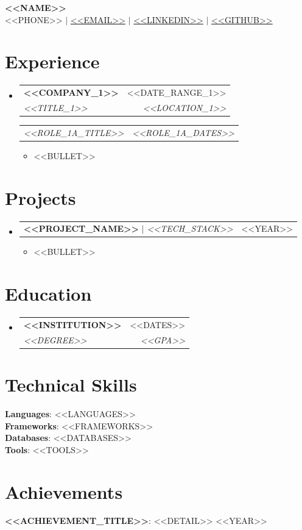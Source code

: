 \documentclass[letterpaper,11pt]{article}
\makeatletter
\newcommand{\resumeItem}[1]{
  \item\small{#1\vspace{-2pt}}
}
\newcommand{\resumeSubheading}[4]{
  \vspace{-2pt}\item
    \begin{tabular*}{0.97\textwidth}[t]{l@{\extracolsep{\fill}}r}
      \textbf{#1} & #2 \\
      \textit{\small#3} & \textit{\small #4} \\
    \end{tabular*}\vspace{-7pt}
}
\newcommand{\resumeRole}[2]{
  \vspace{2pt}
  \begin{tabular*}{0.97\textwidth}[t]{l@{\extracolsep{\fill}}r}
    \textit{\small#1} & \textit{\small #2} \\
  \end{tabular*}\vspace{-7pt}
}
\newcommand{\resumeProjectHeading}[2]{
  \vspace{-2pt}\item
    \begin{tabular*}{0.97\textwidth}[t]{l@{\extracolsep{\fill}}r}
      \small#1 & #2 \\
    \end{tabular*}\vspace{-7pt}
}
\newcommand{\resumeSubHeadingListStart}{\begin{itemize}[leftmargin=0.15in, label={}]}
\newcommand{\resumeSubHeadingListEnd}{\end{itemize}}
\newcommand{\resumeItemListStart}{\begin{itemize}}
\newcommand{\resumeItemListEnd}{\end{itemize}\vspace{-5pt}}
\makeatother
\begin{document}
\begin{center}
    \textbf{\Huge \scshape <<NAME>>} \\ \vspace{1pt}
    \small <<PHONE>> $|$
    \href{mailto:<<EMAIL>>}{<<EMAIL>>} $|$
    \href{https://<<LINKEDIN>>}{<<LINKEDIN>>} $|$
    \href{https://<<GITHUB>>}{<<GITHUB>>}
\end{center}

\section{Experience}
  \resumeSubHeadingListStart

    \resumeSubheading
      {<<COMPANY_1>>}{<<DATE_RANGE_1>>}
      {<<TITLE_1>>}{<<LOCATION_1>>}

      \resumeRole{<<ROLE_1A_TITLE>>}{<<ROLE_1A_DATES>>}
      \resumeItemListStart
        \resumeItem{<<BULLET>>}
      \resumeItemListEnd

  \resumeSubHeadingListEnd

\section{Projects}
  \resumeSubHeadingListStart

    \resumeProjectHeading
      {\textbf{<<PROJECT_NAME>>} $|$ \emph{<<TECH_STACK>>}}{<<YEAR>>}
      \resumeItemListStart
        \resumeItem{<<BULLET>>}
      \resumeItemListEnd

  \resumeSubHeadingListEnd

\section{Education}
  \resumeSubHeadingListStart

    \resumeSubheading
      {<<INSTITUTION>>}{<<DATES>>}
      {<<DEGREE>>}{<<GPA>>}

  \resumeSubHeadingListEnd

\section{Technical Skills}
  \begin{itemize}[leftmargin=0.15in, label={}]
    \small{\item{
      \textbf{Languages}{: <<LANGUAGES>>} \\
      \textbf{Frameworks}{: <<FRAMEWORKS>>} \\
      \textbf{Databases}{: <<DATABASES>>} \\
      \textbf{Tools}{: <<TOOLS>>}
    }}
  \end{itemize}

\section{Achievements}
  \begin{itemize}[leftmargin=0.15in, label={}]
    \small{\item{
      \textbf{<<ACHIEVEMENT_TITLE>>}: <<DETAIL>> \hfill <<YEAR>>
    }}
  \end{itemize}

\end{document}
